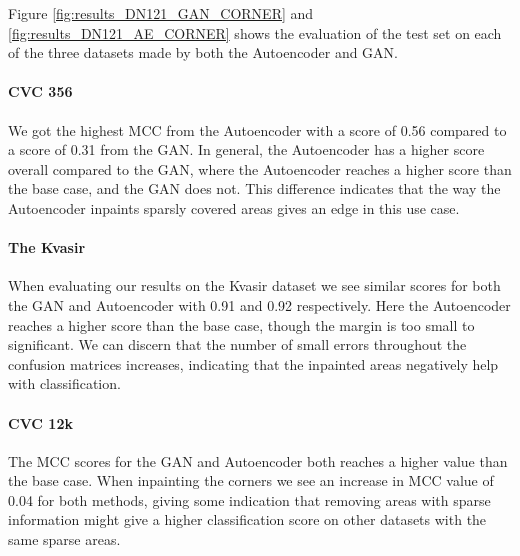 %
\noindent Figure \ref{fig:results_DN121_GAN_CORNER} and \ref{fig:results_DN121_AE_CORNER} shows the evaluation of the test set on each of the three datasets made by both the Autoencoder and GAN. 

\paragraph{CVC 356}
We got the highest MCC from the Autoencoder with a score of 0.56 compared to a score of 0.31 from the GAN.
In general, the Autoencoder has a higher score overall compared to the GAN, where the Autoencoder reaches a higher score than the base case, and the GAN does not.
This difference indicates that the way the Autoencoder inpaints sparsly covered areas gives an edge in this use case. 


\paragraph{The Kvasir}
When evaluating our results on the Kvasir dataset we see similar scores for both the GAN and Autoencoder with 0.91 and 0.92 respectively. Here the Autoencoder reaches a higher score than the base case, though the margin is too small to significant.
We can discern that the number of small errors throughout the confusion matrices increases, indicating that the inpainted areas negatively help with classification.

\paragraph{CVC 12k}
The MCC scores for the GAN and Autoencoder both reaches a higher value than the base case. When inpainting the corners we see an increase in MCC value of 0.04 for both methods, giving some indication that removing areas with sparse information might give a higher classification score on other datasets with the same sparse areas.






































